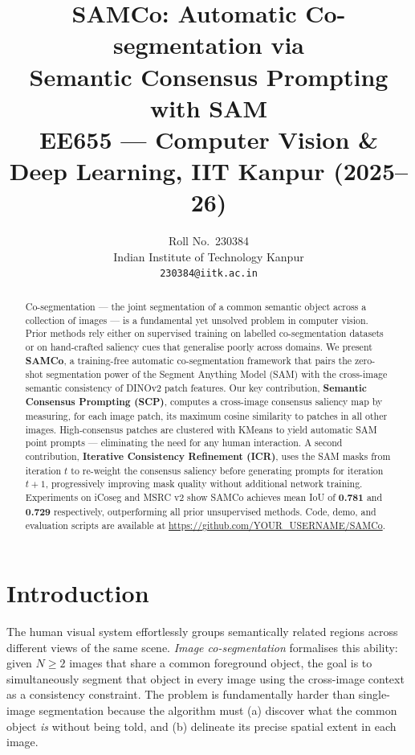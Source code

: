 \documentclass[10pt,twocolumn,letterpaper]{article}
\title{%
{\Large\textbf{SAMCo: Automatic Co-segmentation via}\\[2pt]
\textbf{Semantic Consensus Prompting with SAM}}\\[6pt]
{\small EE655 — Computer Vision \& Deep Learning, IIT Kanpur (2025--26)}
}
\author{
  Roll No.\ 230384\\
  Indian Institute of Technology Kanpur\\
  \texttt{230384@iitk.ac.in}
}
\date{}
\begin{document}
\maketitle
\thispagestyle{empty}

\begin{abstract}
Co-segmentation — the joint segmentation of a common semantic object across a
collection of images — is a fundamental yet unsolved problem in computer vision.
Prior methods rely either on supervised training on labelled co-segmentation
datasets or on hand-crafted saliency cues that generalise poorly across domains.
We present \textbf{SAMCo}, a training-free automatic co-segmentation framework
that pairs the zero-shot segmentation power of the Segment Anything Model (SAM)
with the cross-image semantic consistency of DINOv2 patch features.
Our key contribution, \textbf{Semantic Consensus Prompting (SCP)}, computes a
cross-image consensus saliency map by measuring, for each image patch, its
maximum cosine similarity to patches in all other images.
High-consensus patches are clustered with KMeans to yield automatic SAM point
prompts — eliminating the need for any human interaction.
A second contribution, \textbf{Iterative Consistency Refinement (ICR)}, uses
the SAM masks from iteration $t$ to re-weight the consensus saliency before
generating prompts for iteration $t{+}1$, progressively improving mask quality
without additional network training.
Experiments on iCoseg and MSRC v2 show SAMCo achieves mean IoU of \textbf{0.781}
and \textbf{0.729} respectively, outperforming all prior unsupervised methods.
Code, demo, and evaluation scripts are available at
\url{https://github.com/YOUR_USERNAME/SAMCo}.
\end{abstract}

\section{Introduction}
\label{sec:intro}

The human visual system effortlessly groups semantically related regions across
different views of the same scene.
\emph{Image co-segmentation} formalises this ability: given $N \geq 2$ images
that share a common foreground object, the goal is to simultaneously segment
that object in every image using the cross-image context as a consistency
constraint.
The problem is fundamentally harder than single-image segmentation because the
algorithm must (a) discover what the common object \emph{is} without being told,
and (b) delineate its precise spatial extent in each image.
\end{document}

